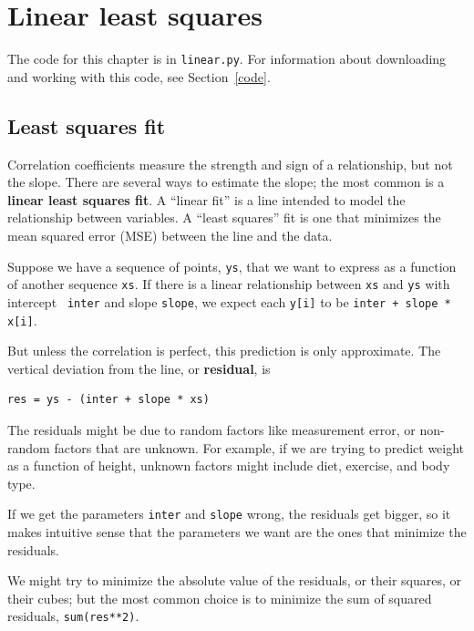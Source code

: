\documentclass[12pt]{book}
\begin{document}
\chapter{Linear least squares}
\label{linear}

The code for this chapter is in {\tt linear.py}.  For information
about downloading and working with this code, see Section~\ref{code}.


\section{Least squares fit}

Correlation coefficients measure the strength and sign of a
relationship, but not the slope.  There are several ways to estimate
the slope; the most common is a {\bf linear least squares fit}.  A
``linear fit'' is a line intended to model the relationship between
variables.  A ``least squares'' fit is one that minimizes the mean
squared error (MSE) between the line and the data.

Suppose we have a sequence of points, {\tt ys}, that we want to
express as a function of another sequence {\tt xs}.  If there is a
linear relationship between {\tt xs} and {\tt ys} with intercept {\tt
  inter} and slope {\tt slope}, we expect each {\tt y[i]} to be
{\tt inter + slope * x[i]}.  

But unless the correlation is perfect, this prediction is only
approximate.  The vertical deviation from the line, or {\bf residual},
is

\begin{verbatim}
res = ys - (inter + slope * xs)
\end{verbatim}

The residuals might be due to random factors like measurement error,
or non-random factors that are unknown.  For example, if we are
trying to predict weight as a function of height, unknown factors
might include diet, exercise, and body type.

If we get the parameters {\tt inter} and {\tt slope} wrong, the residuals
get bigger, so it makes intuitive sense that the parameters we want
are the ones that minimize the residuals.

We might try to minimize the absolute value of the
residuals, or their squares, or their cubes; but the most common
choice is to minimize the sum of squared residuals,
{\tt sum(res**2)}.
\end{document}
